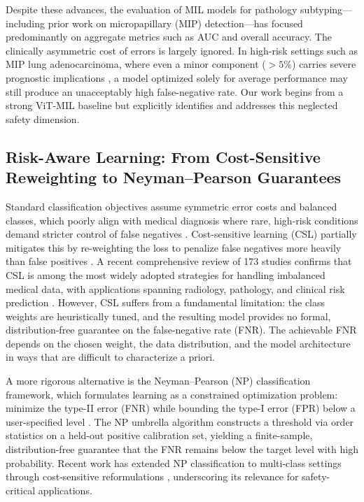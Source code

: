   Despite these advances, the evaluation of MIL models for pathology subtyping---including prior work on micropapillary (MIP) detection---has focused predominantly on aggregate metrics such as AUC and       
  overall accuracy. The clinically asymmetric cost of errors is largely ignored. In high-risk settings such as MIP lung adenocarcinoma, where even a minor component ($>5\%$) carries severe prognostic
  implications \cite{caso2020underlying, dai2017tumor}, a model optimized solely for average performance may still produce an unacceptably high false-negative rate. Our work begins from a strong ViT-MIL     
  baseline but explicitly identifies and addresses this neglected safety dimension.

  \subsection{Risk-Aware Learning: From Cost-Sensitive Reweighting to Neyman--Pearson Guarantees}                                                                                                              
   
  Standard classification objectives assume symmetric error costs and balanced classes, which poorly align with medical diagnosis where rare, high-risk conditions demand stricter control of false negatives  
  \cite{he2009learning}. Cost-sensitive learning (CSL) partially mitigates this by re-weighting the loss to penalize false negatives more heavily than false positives \cite{elkan2001foundations}. A recent
  comprehensive review of 173 studies confirms that CSL is among the most widely adopted strategies for handling imbalanced medical data, with applications spanning radiology, pathology, and clinical risk   
  prediction \cite{araf2024cost}. However, CSL suffers from a fundamental limitation: the class weights are heuristically tuned, and the resulting model provides no formal, distribution-free guarantee on the
   false-negative rate (FNR). The achievable FNR depends on the chosen weight, the data distribution, and the model architecture in ways that are difficult to characterize a priori.

  A more rigorous alternative is the Neyman--Pearson (NP) classification framework, which formulates learning as a constrained optimization problem: minimize the type-II error (FNR) while bounding the type-I
   error (FPR) below a user-specified level \cite{rigollet2011neyman}. The NP umbrella algorithm \cite{tong2018neyman} constructs a threshold via order statistics on a held-out positive calibration set,
  yielding a finite-sample, distribution-free guarantee that the FNR remains below the target level with high probability. Recent work has extended NP classification to multi-class settings through          
  cost-sensitive reformulations \cite{tian2025neyman}, underscoring its relevance for safety-critical applications.

